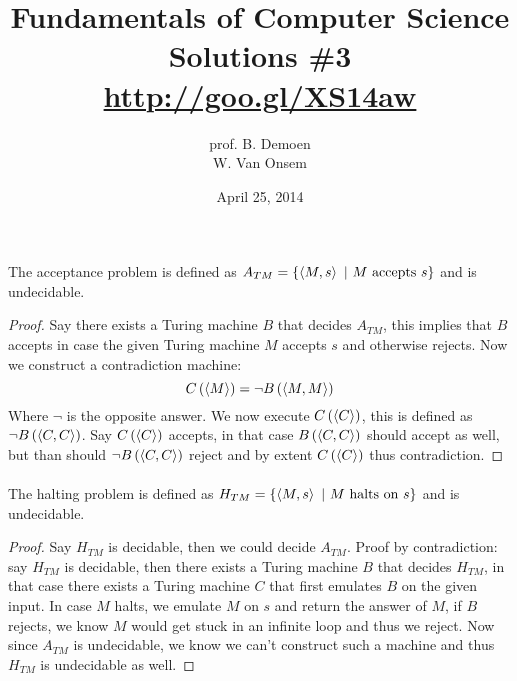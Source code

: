 \documentclass{article}
\title{Fundamentals of Computer Science\\Solutions \#3\\\url{http://goo.gl/XS14aw}}
\author{prof. B. Demoen\\W. Van Onsem}
\date{April 25, 2014}
\begin{document}
\maketitle
\begin{prel}
The acceptance problem is defined as $A_{TM}=\left\{ \left\langle M,s \right\rangle\ |\ \mbox{$M$ accepts $s$} \right\}$ and is undecidable.
\begin{proof}
Say there exists a Turing machine $B$ that decides $A_{TM}$, this implies that $B$ accepts in case the given Turing machine $M$ accepts $s$ and otherwise rejects. Now we construct a contradiction machine:
\begin{equation}
C\left( \left\langle M \right\rangle \right)=\neg B\left( \left\langle M,M \right\rangle \right)
\end{equation}
Where $\neg$ is the opposite answer. We now execute $C\left( \left\langle C \right\rangle \right)$, this is defined as $\neg B\left( \left\langle C,C \right\rangle \right)$. Say $C\left( \left\langle C \right\rangle \right)$ accepts, in that case $B\left( \left\langle C,C \right\rangle \right)$ should accept as well, but than should $\neg B\left( \left\langle C,C \right\rangle \right)$ reject and by extent $C\left( \left\langle C \right\rangle \right)$ thus contradiction.
\end{proof}
\paragraph{}
The halting problem is defined as $H_{TM}=\left\{ \left\langle M,s \right\rangle\ |\ \mbox{$M$ halts on $s$} \right\}$ and is undecidable.
\begin{proof}
Say $H_{TM}$ is decidable, then we could decide $A_{TM}$. Proof by contradiction: say $H_{TM}$ is decidable, then there exists a Turing machine $B$ that decides $H_{TM}$, in that case there exists a Turing machine $C$ that first emulates $B$ on the given input. In case $M$ halts, we emulate $M$ on $s$ and return the answer of $M$, if $B$ rejects, we know $M$ would get stuck in an infinite loop and thus we reject. Now since $A_{TM}$ is undecidable, we know we can't construct such a machine and thus $H_{TM}$ is undecidable as well.
\end{proof}
\end{prel}
\end{document}
